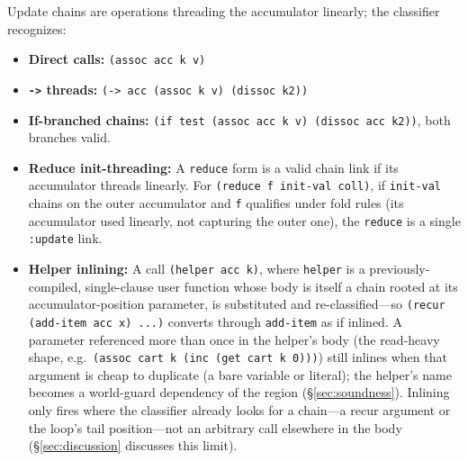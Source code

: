 \documentclass[sigplan,review,anonymous]{acmart}
\begin{document}
Update chains are operations threading the accumulator linearly; the classifier recognizes:
\begin{itemize}
    \item \textbf{Direct calls:} \texttt{(assoc acc k v)}
    \item \textbf{\texttt{->} threads:} \texttt{(-> acc (assoc k v) (dissoc k2))}
    \item \textbf{If-branched chains:} \texttt{(if test (assoc acc k v) (dissoc acc k2))}, both branches valid.
    \item \textbf{Reduce init-threading:} A \texttt{reduce} form is a valid chain link if its accumulator threads linearly. For \texttt{(reduce f init-val coll)}, if \texttt{init-val} chains on the outer accumulator and \texttt{f} qualifies under fold rules (its accumulator used linearly, not capturing the outer one), the \texttt{reduce} is a single \texttt{:update} link.
    \item \textbf{Helper inlining:} A call \texttt{(helper acc k)}, where \texttt{helper} is a previously-compiled, single-clause user function whose body is itself a chain rooted at its accumulator-position parameter, is substituted and re-classified---so \texttt{(recur (add-item acc x) ...)} converts through \texttt{add-item} as if inlined. A parameter referenced more than once in the helper's body (the read-heavy shape, e.g.\ \texttt{(assoc cart k (inc (get cart k 0)))}) still inlines when that argument is cheap to duplicate (a bare variable or literal); the helper's name becomes a world-guard dependency of the region (§\ref{sec:soundness}). Inlining only fires where the classifier already looks for a chain---a recur argument or the loop's tail position---not an arbitrary call elsewhere in the body (§\ref{sec:discussion} discusses this limit).

\end{itemize}
\end{document}
